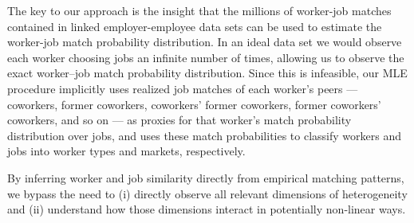 \documentclass[12pt]{article}
\theoremstyle{definition}
\theoremstyle{plain}
\begin{document}
The key to our approach is the insight that the millions of worker-job matches contained in linked employer-employee data sets can be used to estimate the worker-job match probability distribution. In an ideal data set we would observe each worker choosing jobs an infinite number of times, allowing us to observe the exact worker--job match probability distribution. Since this is infeasible, our MLE procedure implicitly uses realized job matches of each worker's peers --- coworkers, former coworkers, coworkers' former coworkers, former coworkers' coworkers, and so on --- as proxies for that worker's match probability distribution over jobs, and uses these match probabilities to classify workers and jobs into worker types and markets, respectively.

By inferring worker and job similarity directly from empirical matching patterns, we bypass the need to (i) directly observe all relevant dimensions of heterogeneity and (ii) understand how those dimensions interact in potentially non-linear ways. 




\end{document}
